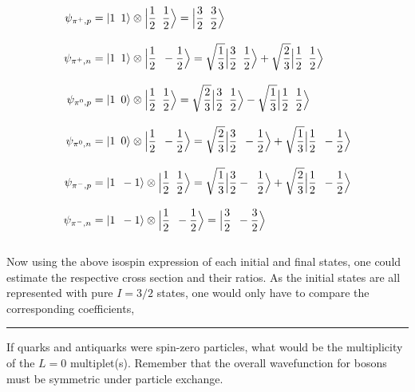 \begin{solution}
\begin{align*}
    \psi_{\pi^+,p} &= \ket{1\hskip0.5em\relax 1} \otimes \Big| \frac{1}{2} \hskip0.5em\relax \frac{1}{2} \Big\rangle = \Big| \frac{3}{2} \hskip0.5em\relax \frac{3}{2} \Big\rangle \\[0.12in]
    \psi_{\pi^+,n} &= \ket{1\hskip0.5em\relax 1} \otimes \Big| \frac{1}{2} \hskip0.5em\relax -\frac{1}{2} \Big\rangle = \sqrt{\frac{1}{3}} \Big| \frac{3}{2} \hskip0.5em\relax \frac{1}{2} \Big\rangle + \sqrt{\frac{2}{3}} \Big| \frac{1}{2} \hskip0.5em\relax \frac{1}{2} \Big\rangle \\[0.12in]
    \psi_{\pi^0,p} &= \ket{1\hskip0.5em\relax 0} \otimes \Big| \frac{1}{2} \hskip0.5em\relax \frac{1}{2} \Big\rangle = \sqrt{\frac{2}{3}} \Big| \frac{3}{2} \hskip0.5em\relax \frac{1}{2} \Big\rangle - \sqrt{\frac{1}{3}} \Big| \frac{1}{2} \hskip0.5em\relax \frac{1}{2} \Big\rangle \\[0.12in]
    \psi_{\pi^0,n} &= \ket{1\hskip0.5em\relax 0} \otimes \Big| \frac{1}{2} \hskip0.5em\relax -\frac{1}{2} \Big\rangle = \sqrt{\frac{2}{3}} \Big| \frac{3}{2} \hskip0.5em\relax -\frac{1}{2} \Big\rangle + \sqrt{\frac{1}{3}} \Big| \frac{1}{2} \hskip0.5em\relax -\frac{1}{2} \Big\rangle \\[0.12in]
    \psi_{\pi^-,p} &= \ket{1\hskip0.5em\relax -1} \otimes \Big| \frac{1}{2} \hskip0.5em\relax \frac{1}{2} \Big\rangle = \sqrt{\frac{1}{3}} \Big| \frac{3}{2} -\hskip0.5em\relax \frac{1}{2} \Big\rangle + \sqrt{\frac{2}{3}} \Big| \frac{1}{2} \hskip0.5em\relax -\frac{1}{2} \Big\rangle \\[0.12in]
    \psi_{\pi^-,n} &= \ket{1\hskip0.5em\relax -1} \otimes \Big| \frac{1}{2} \hskip0.5em\relax -\frac{1}{2} \Big\rangle =   \Big| \frac{3}{2} \hskip0.5em\relax -\frac{3}{2} \Big\rangle 
\end{align*}\\
Now using the above isospin expression of each initial and final states, one could estimate the respective cross section and their ratios. As the initial states are all represented with pure $I=3/2$ states, one would only have to compare the corresponding coefficients,
\end{solution}

\noindent\rule{7in}{1.5pt}


\begin{problem}{9.4}
If quarks and antiquarks were spin-zero particles, what would be the multiplicity of the $L = 0$ multiplet(s). Remember that the overall wavefunction for bosons must be symmetric under particle exchange.
\end{problem}
\begin{solution}

\end{solution}

